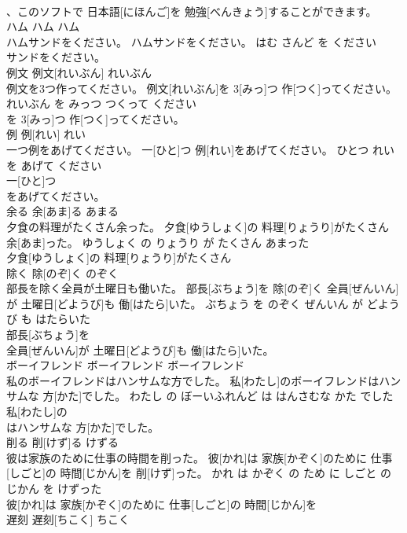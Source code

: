 \documentclass[8pt]{extreport}
\begin{document}
\begin{CJK}{UTF8}{min}
\\	、このソフトで 日本語[にほんご]を 勉強[べんきょう]することができます。			
\\	ハム	ハム	ハム	
\\	ハムサンドをください。	ハムサンドをください。	はむ さんど を ください	
\\	サンドをください。			
\\	例文	例文[れいぶん]	れいぶん	
\\	例文を3つ作ってください。	例文[れいぶん]を 3[みっ]つ 作[つく]ってください。	れいぶん を みっつ つくって ください	
\\	を 3[みっ]つ 作[つく]ってください。			
\\	例	例[れい]	れい	
\\	一つ例をあげてください。	一[ひと]つ 例[れい]をあげてください。	ひとつ れい を あげて ください	
\\	一[ひと]つ
\\	をあげてください。			
\\	余る	余[あま]る	あまる	
\\	夕食の料理がたくさん余った。	夕食[ゆうしょく]の 料理[りょうり]がたくさん 余[あま]った。	ゆうしょく の りょうり が たくさん あまった	
\\	夕食[ゆうしょく]の 料理[りょうり]がたくさん
\\	除く	除[のぞ]く	のぞく	
\\	部長を除く全員が土曜日も働いた。	部長[ぶちょう]を 除[のぞ]く 全員[ぜんいん]が 土曜日[どようび]も 働[はたら]いた。	ぶちょう を のぞく ぜんいん が どようび も はたらいた	
\\	部長[ぶちょう]を
\\	全員[ぜんいん]が 土曜日[どようび]も 働[はたら]いた。			
\\	ボーイフレンド	ボーイフレンド	ボーイフレンド	
\\	私のボーイフレンドはハンサムな方でした。	私[わたし]のボーイフレンドはハンサムな 方[かた]でした。	わたし の ぼーいふれんど は はんさむな かた でした	
\\	私[わたし]の
\\	はハンサムな 方[かた]でした。			
\\	削る	削[けず]る	けずる	
\\	彼は家族のために仕事の時間を削った。	彼[かれ]は 家族[かぞく]のために 仕事[しごと]の 時間[じかん]を 削[けず]った。	かれ は かぞく の ため に しごと の じかん を けずった	
\\	彼[かれ]は 家族[かぞく]のために 仕事[しごと]の 時間[じかん]を
\\	遅刻	遅刻[ちこく]	ちこく	

\end{CJK}
\end{document}
